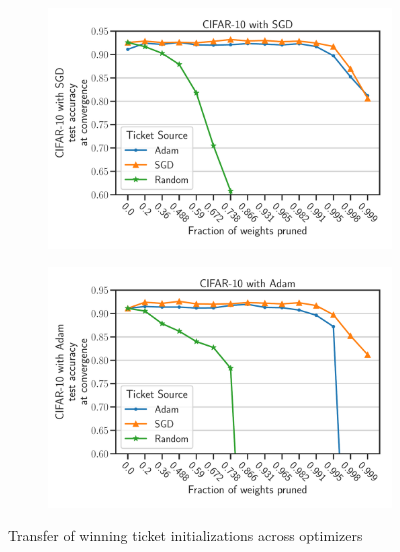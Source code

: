    \begin{figure}[h]
            \begin{subfigure}[b]{0.45\textwidth}
                    \includegraphics[width=\linewidth]{../openreview/plots/Exp3_CIFAR10_SGD_N.pdf}

            \end{subfigure}
            \begin{subfigure}[b]{0.45\textwidth}
                    \includegraphics[width=\linewidth]{../openreview/plots/Exp3_CIFAR10_Adam_N.pdf}
            \end{subfigure}
        \caption{Transfer of winning ticket initializations across optimizers}
        \label{fig:exp3}
    \end{figure}


